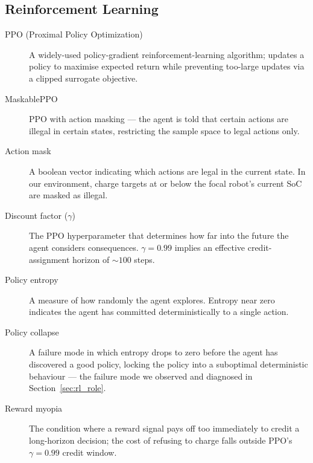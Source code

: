 \documentclass[conference]{IEEEtran}
\begin{document}
\subsection*{Reinforcement Learning}
\begin{description}
  \item[PPO (Proximal Policy Optimization)] A widely-used policy-gradient reinforcement-learning algorithm; updates a policy to maximise expected return while preventing too-large updates via a clipped surrogate objective.
  \item[MaskablePPO] PPO with action masking --- the agent is told that certain actions are illegal in certain states, restricting the sample space to legal actions only.
  \item[Action mask] A boolean vector indicating which actions are legal in the current state. In our environment, charge targets at or below the focal robot's current SoC are masked as illegal.
  \item[Discount factor ($\gamma$)] The PPO hyperparameter that determines how far into the future the agent considers consequences. $\gamma = 0.99$ implies an effective credit-assignment horizon of $\sim 100$ steps.
  \item[Policy entropy] A measure of how randomly the agent explores. Entropy near zero indicates the agent has committed deterministically to a single action.
  \item[Policy collapse] A failure mode in which entropy drops to zero before the agent has discovered a good policy, locking the policy into a suboptimal deterministic behaviour --- the failure mode we observed and diagnosed in Section~\ref{sec:rl_role}.
  \item[Reward myopia] The condition where a reward signal pays off too immediately to credit a long-horizon decision; the cost of refusing to charge falls outside PPO's $\gamma=0.99$ credit window.
\end{description}
\end{document}
